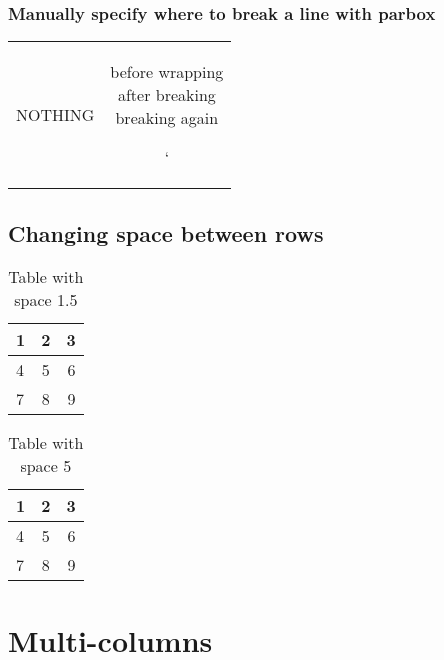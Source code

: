 \documentclass{article}
\begin{document}
	\subsubsection{Manually specify where to break a line with parbox}
	\begin{tabular}{cc}
		NOTHING & \parbox[t]{5cm}{before wrapping\\after breaking\\ breaking again}`
	\end{tabular}

	\subsection{Changing space between rows}
	\begin{table}[t]
		\renewcommand{\arraystretch}{1.5}
		\begin{center}
		\begin{tabular}{ | l | c | r |}
			\hline
			1 & 2 & 3 \\ \hline
			4 & 5 & 6 \\ \hline
			7 & 8 & 9 \\
			\hline
		\end{tabular}
		\end{center}
	\caption{Table with space 1.5}
	\end{table}

		\begin{table}
		\renewcommand{\arraystretch}{5}
		\begin{center}
			\begin{tabular}{ | l | c | r |}
				\hline
				1 & 2 & 3 \\ \hline
				4 & 5 & 6 \\ \hline
				7 & 8 & 9 \\
				\hline
			\end{tabular}
		\end{center}
		\caption{Table with space 5}
	\end{table}
	

\section{Multi-columns}
\end{document}
